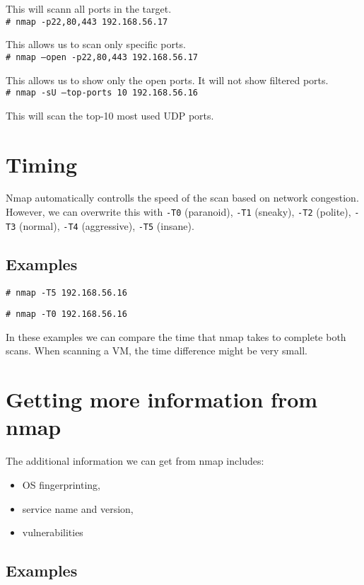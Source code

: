 \documentclass[twocolumn]{article}
\begin{document}
This will scann all ports in the target.\\

\texttt{\# nmap -p22,80,443 192.168.56.17}

This allows us to scan only specific ports.\\

\texttt{\# nmap --open -p22,80,443 192.168.56.17}

This allows us to show only the open ports. It will not show filtered ports.\\

\texttt{\# nmap -sU --top-ports 10 192.168.56.16}

This will scan the top-10 most used UDP ports.

\section{Timing}

Nmap automatically controlls the speed of the scan based on network congestion. However, we can overwrite this with \texttt{-T0} (paranoid), \texttt{-T1} (sneaky), \texttt{-T2} (polite), \texttt{-T3} (normal), \texttt{-T4} (aggressive), \texttt{-T5} (insane).

\subsection{Examples}

\texttt{\# nmap -T5 192.168.56.16}

\texttt{\# nmap -T0 192.168.56.16}

In these examples we can compare the time that nmap takes to complete both scans. When scanning a VM, the time difference might be very small.


\section{Getting more information from nmap}

The additional information we can get from nmap includes:

\begin{itemize}
    \item OS fingerprinting,
    \item service name and version,
    \item vulnerabilities
\end{itemize}

\subsection{Examples}
\end{document}
